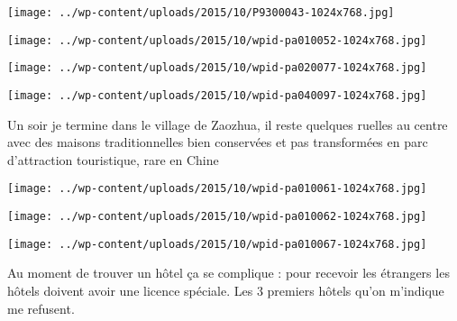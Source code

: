 \begin{center} \texttt{[image: ../wp-content/uploads/2015/10/P9300043-1024x768.jpg]} \end{center}

 

 

\begin{center} \texttt{[image: ../wp-content/uploads/2015/10/wpid-pa010052-1024x768.jpg]} \end{center}

 

 

\begin{center} \texttt{[image: ../wp-content/uploads/2015/10/wpid-pa020077-1024x768.jpg]} \end{center}

 

 

\begin{center} \texttt{[image: ../wp-content/uploads/2015/10/wpid-pa040097-1024x768.jpg]} \end{center}

 

 Un soir je termine dans le village de Zaozhua, il reste quelques ruelles au centre avec des maisons traditionnelles bien conservées et pas transformées en parc d'attraction touristique, rare en Chine 

 

\begin{center} \texttt{[image: ../wp-content/uploads/2015/10/wpid-pa010061-1024x768.jpg]} \end{center}

 

 

\begin{center} \texttt{[image: ../wp-content/uploads/2015/10/wpid-pa010062-1024x768.jpg]} \end{center}

 

 

\begin{center} \texttt{[image: ../wp-content/uploads/2015/10/wpid-pa010067-1024x768.jpg]} \end{center}

 

 Au moment de trouver un hôtel ça se complique : pour recevoir les étrangers les hôtels doivent avoir une licence spéciale. Les 3 premiers hôtels qu'on m'indique me refusent. 

